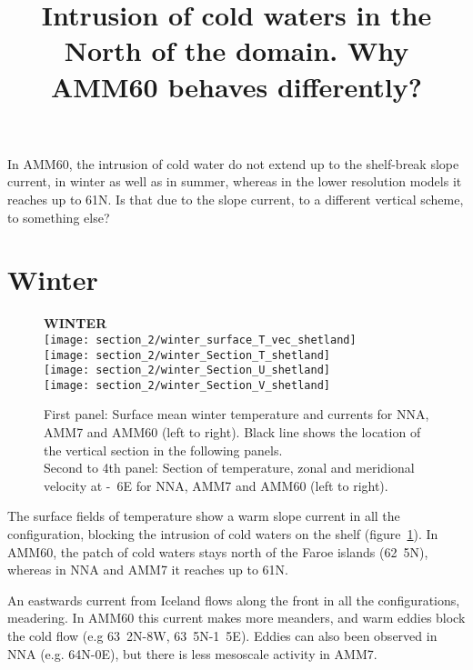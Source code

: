 \documentclass[english,11pt]{article}
\newcommand{\fig}[1]{(figure~\ref{#1})}
\begin{document}
\title{Intrusion of cold waters in the North of the domain. Why AMM60 behaves differently?}
\maketitle

In AMM60, the intrusion of cold water do not extend up to the shelf-break slope current, in winter as well as in summer, whereas in the lower resolution models it reaches up to \unit{61}{\degree N}. Is that due to the slope current, to a different vertical scheme, to something else?
\section{Winter}
\begin{figure}[h!]
	\centering \textbf{WINTER} \\
	\texttt{[image: section\_2/winter\_surface\_T\_vec\_shetland]}\\
	\texttt{[image: section\_2/winter\_Section\_T\_shetland]}\\
	\texttt{[image: section\_2/winter\_Section\_U\_shetland]}\\
	\texttt{[image: section\_2/winter\_Section\_V\_shetland]}\\

	\caption{First panel: Surface mean winter temperature and currents for NNA, AMM7 and AMM60 (left to right). Black line shows the location of the vertical section in the following panels.\\ Second to 4th panel: Section of temperature, zonal and meridional velocity at \unit{-6}{\degree E} for NNA, AMM7 and AMM60 (left to right). }
	\label{fig_winter}
\end{figure}

The surface fields of temperature show a warm slope current in all the configuration, blocking the intrusion of cold waters on the shelf \fig{fig_winter}. In AMM60, the patch of cold waters stays north of the Faroe islands (\unit{62.5}{\degree N}), whereas in NNA and AMM7 it reaches up to \unit{61}{\degree N}. 

An eastwards current from Iceland flows along the front in all the configurations, meadering. In AMM60 this current makes more meanders, and warm eddies block the cold flow (e.g \unit{63.2}{\degree N}-\unit{8}{\degree W}, \unit{63.5}{\degree N}-\unit{1.5}{\degree E}). Eddies can also been observed in NNA (e.g. \unit{64}{\degree N}-\unit{0}{\degree E}), but there is less mesoscale activity in AMM7.
\end{document}
